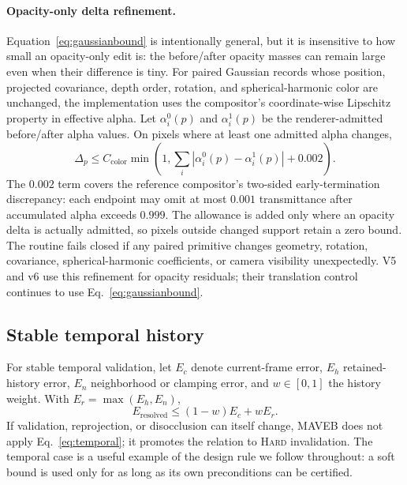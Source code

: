 \documentclass[acmtog,nonacm]{acmart}
\newcommand{\system}{MAVEB}
\newcommand{\hard}{\textsc{Hard}}
\begin{document}
\paragraph{Opacity-only delta refinement.}
Equation~\ref{eq:gaussianbound} is intentionally general, but it is insensitive to how small an opacity-only edit is: the before/after opacity masses can remain large even when their difference is tiny. For paired Gaussian records whose position, projected covariance, depth order, rotation, and spherical-harmonic color are unchanged, the implementation uses the compositor's coordinate-wise Lipschitz property in effective alpha. Let $\alpha_i^0(p)$ and $\alpha_i^1(p)$ be the renderer-admitted before/after alpha values. On pixels where at least one admitted alpha changes,
\begin{equation}
\Delta_p \le C_{\mathrm{color}}
\min\!\left(1,\sum_i\left|\alpha_i^0(p)-\alpha_i^1(p)\right|+0.002\right).
\label{eq:opacitydelta}
\end{equation}
The $0.002$ term covers the reference compositor's two-sided early-termination discrepancy: each endpoint may omit at most $0.001$ transmittance after accumulated alpha exceeds $0.999$. The allowance is added only where an opacity delta is actually admitted, so pixels outside changed support retain a zero bound. The routine fails closed if any paired primitive changes geometry, rotation, covariance, spherical-harmonic coefficients, or camera visibility unexpectedly. V5 and v6 use this refinement for opacity residuals; their translation control continues to use Eq.~\ref{eq:gaussianbound}.

\subsection{Stable temporal history}
For stable temporal validation, let $E_c$ denote current-frame error, $E_h$ retained-history error, $E_n$ neighborhood or clamping error, and $w\in[0,1]$ the history weight. With $E_r=\max(E_h,E_n)$,
\begin{equation}
E_{\mathrm{resolved}}\le(1-w)E_c+wE_r.
\label{eq:temporal}
\end{equation}
If validation, reprojection, or disocclusion can itself change, \system{} does not apply Eq.~\ref{eq:temporal}; it promotes the relation to \hard{} invalidation. The temporal case is a useful example of the design rule we follow throughout: a soft bound is used only for as long as its own preconditions can be certified.
\end{document}

